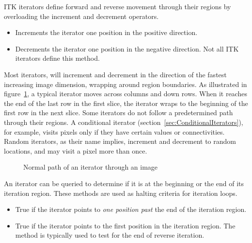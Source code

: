 ITK iterators define forward and reverse movement through their regions by
overloading the increment and decrement operators.

\begin{itemize}
\item \textbf{} Increments the iterator one position in the
positive direction.

\item \textbf{} Decrements the iterator one position in the
negative direction.  Not all ITK iterators define this method.
\end{itemize}

Most iterators, will increment and decrement in the direction of the fastest
increasing image dimension, wrapping around region boundaries.  As illustrated
in figure~{\ref{fig:WalkingIterator}}, a typical iterator moves across columns
and down rows.  When it reaches the end of the last row in the first slice, the
iterator wraps to the beginning of the first row in the next slice.  Some
iterators do not follow a predetermined path through their regions.  A
conditional iterator (section~\ref{sec:ConditionalIterators}), for example,
visits pixels only if they have certain values or connectivities.  Random
iterators, as their name implies, increment and decrement to random locations,
and may visit a pixel more than once.

\begin{figure}
\centering
\caption[Normal iterator path.]{Normal path of an iterator through an image}
\protect\label{fig:WalkingIterator}
\end{figure}


An iterator can be queried to determine if it is at the beginning or the end of
its iteration region.  These methods are used as halting criteria for iteration
loops.

\begin{itemize}
\item \textbf{} True if the iterator points to \emph{one
position past} the end of the iteration region.

\item \textbf{} True if the iterator points to the first
position in the iteration region.  The method is typically used to test for the
end of reverse iteration.
\end{itemize}


